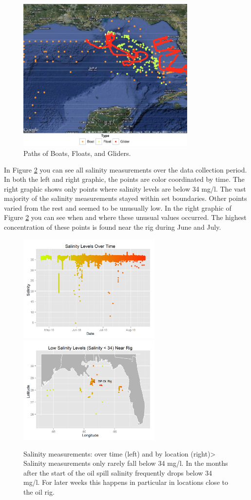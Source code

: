 \documentclass[authoryear,12pt]{elsarticle}
\begin{document}
\begin{figure}[htbp] %
   \centering
   \includegraphics[width=3.5in]{boats-floats-gliders.png} 
   \caption{Paths of Boats, Floats, and Gliders. }
   \label{Boats, Floats and Gliders}
\end{figure}
In Figure \ref {salinity-timeline} you can see all salinity measurements over the data collection period. In both the left and right graphic, the points are color coordinated by time. The right graphic shows only points where salinity levels are below 34 mg/l. The vast majority of the salinity measurements stayed within set boundaries. Other points varied from the rest and seemed to be unusually low. In the right graphic of Figure \ref {salinity-timeline} you can see when and where these unusual values occurred. The highest concentration of these points is found near the rig during June and July.
\begin{figure}[htbp] %
   \centering
   \includegraphics[width=2.8in]{salinity-time.png} 
   \includegraphics[width=2.8in]{salinity-map.png} 
   \caption{Salinity measurements: over time (left) and by location (right)> Salinity measurements only rarely fall below 34 mg/l. In the months after the start of the oil spill salinity frequently drops below 34 mg/l. For later weeks this happens in particular in locations close to the oil rig.}
   \label{salinity-timeline}
\end{figure}
\end{document}
